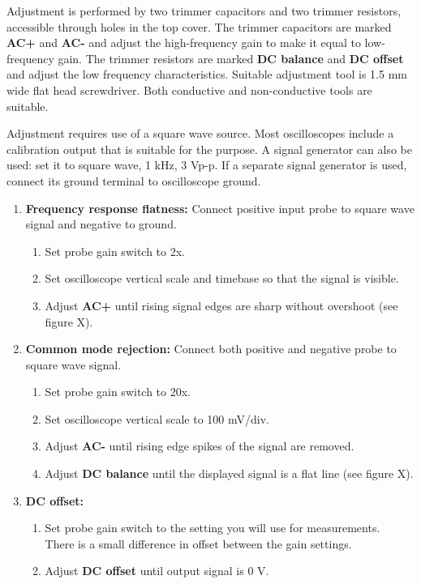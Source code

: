 \documentclass[10pt]{manual}
\begin{document}
Adjustment is performed by two trimmer capacitors and two trimmer resistors, accessible through holes in the top cover.
The trimmer capacitors are marked \textbf{AC+} and \textbf{AC-} and adjust the high-frequency gain to make it equal to low-frequency gain.
The trimmer resistors are marked \textbf{DC balance} and \textbf{DC offset} and adjust the low frequency characteristics.
Suitable adjustment tool is 1.5 mm wide flat head screwdriver.
Both conductive and non-conductive tools are suitable.

Adjustment requires use of a square wave source.
Most oscilloscopes include a calibration output that is suitable for the purpose.
A signal generator can also be used: set it to square wave, 1 kHz, 3 Vp-p.
If a separate signal generator is used, connect its ground terminal to oscilloscope ground.

\begin{enumerate}
\item \textbf{Frequency response flatness:} Connect positive input probe to square wave signal and negative to ground.
\begin{enumerate}
\item Set probe gain switch to 2x.
\item Set oscilloscope vertical scale and timebase so that the signal is visible.
\item Adjust \textbf{AC+} until rising signal edges are sharp without overshoot (see figure X).
\end{enumerate}
\item \textbf{Common mode rejection:} Connect both positive and negative probe to square wave signal.
\begin{enumerate}
\item Set probe gain switch to 20x.
\item Set oscilloscope vertical scale to 100 mV/div.
\item Adjust \textbf{AC-} until rising edge spikes of the signal are removed.
\item Adjust \textbf{DC balance} until the displayed signal is a flat line (see figure X).
\end{enumerate}
\item \textbf{DC offset:}
\begin{enumerate}
\item Set probe gain switch to the setting you will use for measurements.\\There is a small difference in offset between the gain settings.
\item Adjust \textbf{DC offset} until output signal is 0 V.
\end{enumerate}
\end{enumerate}
\end{document}
